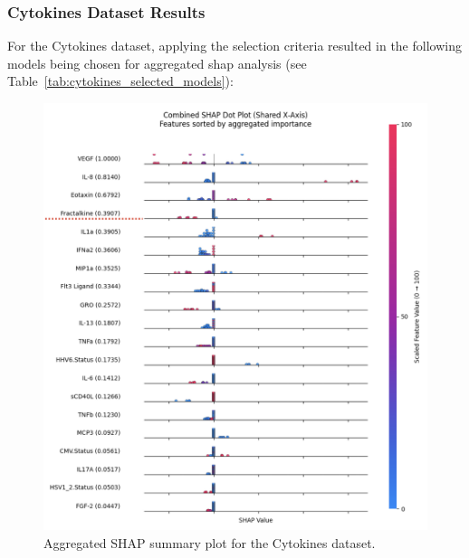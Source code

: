 \documentclass[12pt,a4paper]{report}
\begin{document}
\subsubsection*{Cytokines Dataset Results}

For the Cytokines dataset, applying the selection criteria resulted in the following models being chosen for aggregated \gls{shap} analysis (see Table~\ref{tab:cytokines_selected_models}):

\begin{table}[H]
    \centering
    \caption[Selected Models for Cytokines]{Models selected for aggregated SHAP analysis for the Cytokines dataset.}
    \label{tab:cytokines_selected_models}
\end{table}
\begin{figure}[h!]
    \centering
    \includegraphics[width=0.9\linewidth]{images/Aggregated_SHAP_cytokines_uncompressed.png}
    \caption[Aggregated SHAP plot for Cytokines]{Aggregated SHAP summary plot for the Cytokines dataset.}
    \label{fig:cytokines_aggregated_shap}
\end{figure}
\end{document}
